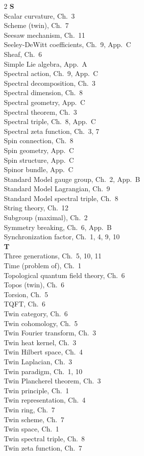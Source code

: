 \documentclass[11pt,a4paper,openright]{book}
\theoremstyle{plain}
\theoremstyle{definition}
\begin{document}
\begin{multicols}{2}
\textbf{S}\\[2pt]
Scalar curvature, Ch.~3\\
Scheme (twin), Ch.~7\\
Seesaw mechanism, Ch.~11\\
Seeley-DeWitt coefficients, Ch.~9, App.~C\\
Sheaf, Ch.~6\\
Simple Lie algebra, App.~A\\
Spectral action, Ch.~9, App.~C\\
Spectral decomposition, Ch.~3\\
Spectral dimension, Ch.~8\\
Spectral geometry, App.~C\\
Spectral theorem, Ch.~3\\
Spectral triple, Ch.~8, App.~C\\
Spectral zeta function, Ch.~3, 7\\
Spin connection, Ch.~8\\
Spin geometry, App.~C\\
Spin structure, App.~C\\
Spinor bundle, App.~C\\
Standard Model gauge group, Ch.~2, App.~B\\
Standard Model Lagrangian, Ch.~9\\
Standard Model spectral triple, Ch.~8\\
String theory, Ch.~12\\
Subgroup (maximal), Ch.~2\\
Symmetry breaking, Ch.~6, App.~B\\
Synchronization factor, Ch.~1, 4, 9, 10\\[4pt]

\textbf{T}\\[2pt]
Three generations, Ch.~5, 10, 11\\
Time (problem of), Ch.~1\\
Topological quantum field theory, Ch.~6\\
Topos (twin), Ch.~6\\
Torsion, Ch.~5\\
TQFT, Ch.~6\\
Twin category, Ch.~6\\
Twin cohomology, Ch.~5\\
Twin Fourier transform, Ch.~3\\
Twin heat kernel, Ch.~3\\
Twin Hilbert space, Ch.~4\\
Twin Laplacian, Ch.~3\\
Twin paradigm, Ch.~1, 10\\
Twin Plancherel theorem, Ch.~3\\
Twin principle, Ch.~1\\
Twin representation, Ch.~4\\
Twin ring, Ch.~7\\
Twin scheme, Ch.~7\\
Twin space, Ch.~1\\
Twin spectral triple, Ch.~8\\
Twin zeta function, Ch.~7\\[4pt]


\end{multicols}
\end{document}
